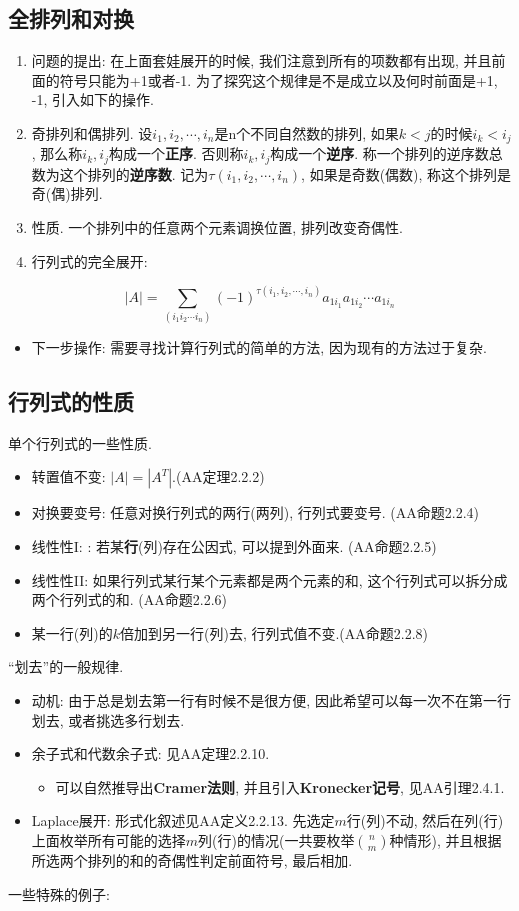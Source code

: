 \subsection*{全排列和对换}
\begin{enumerate}
\item 问题的提出: 在上面套娃展开的时候, 我们注意到所有的项数都有出现, 并且前面的符号只能为+1或者-1. 为了探究这个规律是不是成立以及何时前面是+1,
-1, 引入如下的操作.
\item 奇排列和偶排列. 设$i_{1},i_{2},\cdots,i_{n}$是n个不同自然数的排列, 如果$k<j$的时候$i_{k}<i_{j}$,
那么称$i_{k},i_{j}$构成一个\textbf{正序}. 否则称$i_{k},i_{j}$构成一个\textbf{逆序}.
称一个排列的逆序数总数为这个排列的\textbf{逆序数}. 记为$\tau(i_{1},i_{2},\cdots,i_{n})$,
如果是奇数(偶数), 称这个排列是奇(偶)排列.
\item 性质. 一个排列中的任意两个元素调换位置, 排列改变奇偶性. 
\item 行列式的完全展开: 
\end{enumerate}
\[
|A|=\sum_{(i_{1}i_{2}\cdots i_{n})}(-1)^{\tau(i_{1},i_{2},\cdots,i_{n})}a_{1i_{1}}a_{1i_{2}}\cdots a_{1i_{n}}
\]

\begin{itemize}
\item 下一步操作: 需要寻找计算行列式的简单的方法, 因为现有的方法过于复杂.
\end{itemize}

\subsection*{行列式的性质}

单个行列式的一些性质.
\begin{itemize}
\item 转置值不变: $|A|=|A^{T}|$.(AA定理2.2.2)
\item 对换要变号: 任意对换行列式的两行(两列), 行列式要变号. (AA命题2.2.4)
\item 线性性I: : 若某\textbf{行}(列)存在公因式, 可以提到外面来. (AA命题2.2.5)
\item 线性性II: 如果行列式某行某个元素都是两个元素的和, 这个行列式可以拆分成两个行列式的和. (AA命题2.2.6)
\item 某一行(列)的$k$倍加到另一行(列)去, 行列式值不变.(AA命题2.2.8)
\end{itemize}
``划去''的一般规律.
\begin{itemize}
\item 动机: 由于总是划去第一行有时候不是很方便, 因此希望可以每一次不在第一行划去, 或者挑选多行划去.
\item 余子式和代数余子式: 见AA定理2.2.10.
\begin{itemize}
\item 可以自然推导出\textbf{Cramer法则}, 并且引入\textbf{Kronecker记号}, 见AA引理2.4.1. 
\end{itemize}
\item Laplace展开: 形式化叙述见AA定义2.2.13. 先选定$m$行(列)不动, 然后在列(行)上面枚举所有可能的选择$m$列(行)的情况(一共要枚举${n \choose m}$种情形),
并且根据所选两个排列的和的奇偶性判定前面符号, 最后相加.
\end{itemize}
一些特殊的例子:

